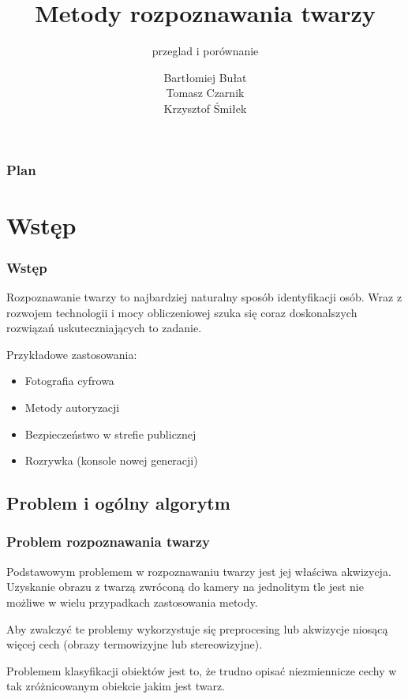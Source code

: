 \documentclass[xcolor=table]{beamer}
\title{Metody rozpoznawania twarzy}
\subtitle{przeglad i porównanie}
\author{Bartłomiej Bułat\\
Tomasz Czarnik\\
Krzysztof Śmiłek\\}
\begin{document}
\begin{frame}
  \titlepage
\end{frame}


\begin{frame}
  \frametitle{Plan}
  \tableofcontents
\end{frame}


\section{Wstęp}

\begin{frame}
  \frametitle{Wstęp}
  Rozpoznawanie twarzy to najbardziej naturalny sposób identyfikacji osób. Wraz z rozwojem technologii i mocy obliczeniowej szuka się coraz doskonalszych rozwiązań uskuteczniających to zadanie.\\[\baselineskip]
 {Przykładowe zastosowania:
\begin{itemize}
\item Fotografia cyfrowa
\item Metody autoryzacji
\item Bezpieczeństwo w strefie publicznej
\item Rozrywka (konsole nowej generacji)
\end{itemize}}
\end{frame}

\subsection{Problem i ogólny algorytm}
\begin{frame}
\frametitle{Problem rozpoznawania twarzy}

Podstawowym problemem w rozpoznawaniu twarzy jest jej właściwa akwizycja. Uzyskanie obrazu z twarzą zwróconą do kamery na jednolitym tle jest nie możliwe w wielu przypadkach zastosowania metody.
\pause

Aby zwalczyć te problemy wykorzystuje się preprocesing lub akwizycje niosącą więcej cech (obrazy termowizyjne lub stereowizyjne).
\pause

Problemem klasyfikacji obiektów jest to, że trudno opisać niezmiennicze cechy w tak zróżnicowanym obiekcie jakim jest twarz.   

\end{frame}

\end{document}

